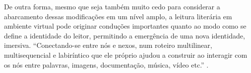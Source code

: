 \begin{refsection}
    De outra forma, mesmo que seja também muito cedo para considerar a abarcamento dessas modificações em um nível amplo, a leitura literária em ambiente virtual pode originar conduções importantes quanto ao modo como se define a identidade do leitor, permitindo a emergência de uma nova identidade, imersiva. “Conectando-se entre nós e nexos, num roteiro multilinear, multisequencial e labiríntico que ele próprio ajudou a construir ao interagir com os nós entre palavras, imagens, documentação, música, vídeo etc.” \cite[p.~33]{Santaella2004Navegar}.

    \printbibliography[heading=subbibliography,notcategory=fullcited]

    \label{chap:leituraend}

\end{refsection}
